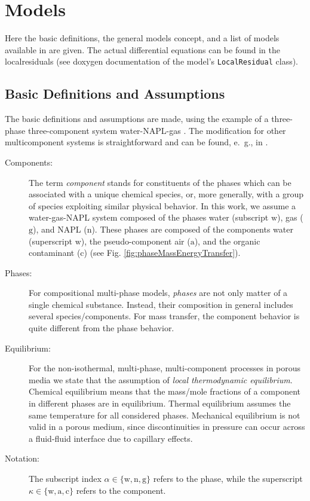 \section{Models}
Here the basic definitions, the general models concept, and a list of
models available in \Dumux are given. The actual differential equations
can be found in the localresiduals (see doxygen documentation of the
model's \texttt{LocalResidual} class).

\subsection{Basic Definitions and Assumptions}
The basic definitions and assumptions are made, using the example
of a three-phase three-component system water-NAPL-gas
\cite{A3:class:2002a}. The modification for other multicomponent
systems is straightforward and can be found, e.\ g., in
\cite{A3:bielinski:2006,A3:acosta:2006}.

\begin{description}
\item[Components:]
The term \emph{component} stands for constituents of the phases which
can be associated with a unique chemical species, or, more generally, with
a group of species exploiting similar physical behavior. In this work, we
assume a water-gas-NAPL system composed of the phases water (subscript
$\text{w}$), gas ($\text{g}$), and NAPL ($\text{n}$). These phases are
composed of the components water (superscript $\text{w}$), the pseudo-component
air ($\text{a}$), and the organic contaminant ($\text{c}$) (see Fig.
\ref{fig:phaseMassEnergyTransfer}).

\item[Phases:]
For compositional multi-phase models, \emph{phases}
are not only matter of a single chemical substance. Instead, their
composition in general includes several species/components. For mass transfer,
the component behavior is quite different from the phase behavior.

\item[Equilibrium:]
For the non-isothermal, multi-phase, multi-component processes in porous media
we state that the assumption of \emph{local thermodynamic equilibrium}.
Chemical equilibrium means that the mass/mole fractions of a component in
different phases are in equilibrium.
Thermal equilibrium assumes the same temperature for all considered phases.
Mechanical equilibrium is not valid in a porous medium, since discontinuities
in pressure can occur across a fluid-fluid interface due to capillary effects.

\item[Notation:]
The subscript index $\alpha \in \{\text{w}, \text{n}, \text{g}\}$ refers
to the phase, while the superscript $\kappa \in \{\text{w}, \text{a}, \text{c}\}$
refers to the component.
\end{description}

